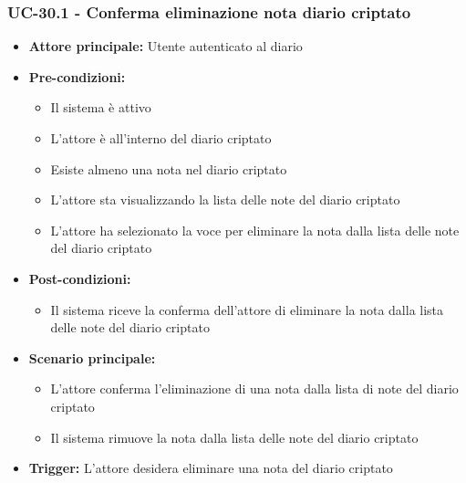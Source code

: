 \documentclass[a4paper,12pt]{article}
\begin{document}
\subsubsection{UC-30.1 - Conferma eliminazione nota diario criptato}\label{subsec:UC-30.1}
\begin{itemize}
    \item \textbf{Attore principale:} Utente autenticato al diario
    \item \textbf{Pre-condizioni:}
    \begin{itemize}
        \item Il sistema è attivo
        \item L'attore è all'interno del diario criptato
        \item Esiste almeno una nota nel diario criptato
        \item L'attore sta visualizzando la lista delle note del diario criptato
        \item L'attore ha selezionato la voce per eliminare la nota dalla lista delle note del diario criptato
    \end{itemize}
    \item \textbf{Post-condizioni:}
    \begin{itemize}
        \item Il sistema riceve la conferma dell'attore di eliminare la nota dalla lista delle note del diario criptato
    \end{itemize}
    \item \textbf{Scenario principale:}
    \begin{itemize}
        \item L'attore conferma l'eliminazione di una nota dalla lista di note del diario criptato
        \item Il sistema rimuove la nota dalla lista delle note del diario criptato
    \end{itemize}
    \item \textbf{Trigger:} L'attore desidera eliminare una nota del diario criptato
\end{itemize}
\end{document}
